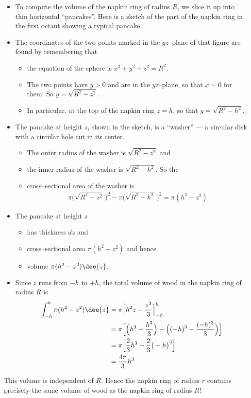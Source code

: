 \begin{eg}
\begin{itemize}
 \item To compute the volume of the napkin ring of radius $R$, we slice it up into thin
horizontal ``pancakes''. Here is a sketch
of the part of the napkin ring in the first octant showing a typical
pancake.%
\item The coordinates of the two points marked in the $yz$--plane of that figure
are found by remembering that
\begin{itemize}\itemsep1pt \parskip0pt 
\item the equation of the sphere is $x^2+y^2+z^2=R^2$.
\item The two points have $y>0$ and are in the $yz$--plane, so that
$x=0$ for them. So $y=\sqrt{R^2-z^2}$.
\item In particular, at the top of the napkin ring $z=h$,
so that $y=\sqrt{R^2-h^2}$.
\end{itemize}
\item The pancake at height $z$, shown in the sketch, is a ``washer'' --- a circular disk
with a circular hole cut in its center.
\begin{itemize}
\item The outer radius of the washer is $\sqrt{R^2-z^2}$ and
\item the inner radius of the washer is $\sqrt{R^2-h^2}$. So the
\item  cross--sectional area of the washer is
\begin{align*}
\pi\big(\sqrt{R^2-z^2}\,\big)^2-\pi\big(\sqrt{R^2-h^2}\,\big)^2
=\pi(h^2-z^2)
\end{align*}
\end{itemize}
\item The pancake at height $z$
\begin{itemize}
\item has thickness $dz$ and
\item cross--sectional area $\pi(h^2-z^2)$ and hence
\item volume $\pi(h^2-z^2)\dee{z}$.
\end{itemize}
\item Since $z$ runs from $-h$ to $+h$, the total volume
of wood in the napkin ring of radius $R$ is
\begin{align*}
\int_{-h}^h \pi(h^2-z^2)\dee{z}
&=\pi\Big[h^2z-\frac{z^3}{3}\Big]_{-h}^h \\
&=\pi\Big[\Big(h^3-\frac{h^3}{3}\Big)
          -\Big((-h)^3-\frac{(-h)^3}{3}\Big)\Big]\\
&=\pi\Big[\frac{2}{3}h^3-\frac{2}{3}\big(-h\big)^3\Big] \\
&=\frac{4\pi}{3}h^3
\end{align*}
\end{itemize}
This volume is independent of $R$. Hence the napkin ring of radius $r$ contains precisely
the same volume of wood as the napkin ring of radius $R$!
\end{eg}

